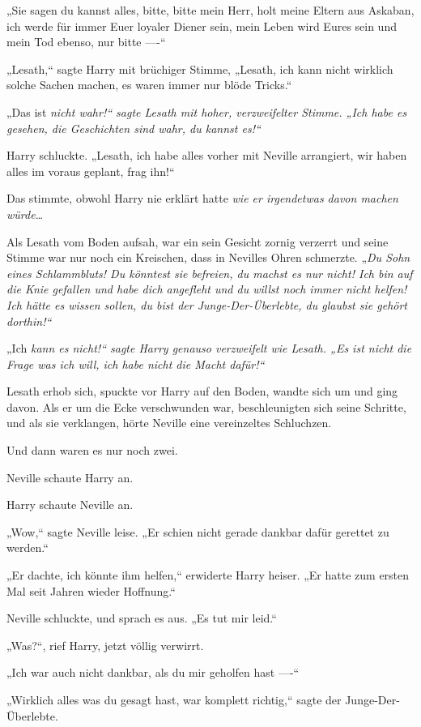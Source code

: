 {„Sie sagen du kannst alles, bitte, bitte mein Herr, holt meine Eltern aus Askaban, ich werde für immer Euer loyaler Diener sein, mein Leben wird Eures sein und mein Tod ebenso, nur bitte ----“

„Lesath,“ sagte Harry mit brüchiger Stimme, „Lesath, ich kann nicht wirklich solche Sachen machen, es waren immer nur blöde Tricks.“

„Das ist \emph{nicht wahr!“ sagte Lesath mit hoher, verzweifelter Stimme. „Ich \emph{habe es gesehen,} die Geschichten sind wahr, du \emph{kannst} es!“}

Harry schluckte. „Lesath, ich habe alles vorher mit Neville arrangiert, wir haben alles im voraus geplant, frag ihn!“

Das stimmte, obwohl Harry nie erklärt hatte \emph{wie er irgendetwas davon machen würde…}

Als Lesath vom Boden aufsah, war ein sein Gesicht zornig verzerrt und seine Stimme war nur noch ein Kreischen, dass in Nevilles Ohren schmerzte. „\emph{Du Sohn eines Schlammbluts! Du könntest sie befreien, du machst es nur nicht! Ich bin auf die Knie gefallen und habe dich angefleht und du willst noch immer nicht helfen! Ich hätte es wissen sollen, du bist der Junge-Der-Überlebte, du glaubst sie gehört \emph{dorthin!“}}

„Ich \emph{kann es nicht!“ sagte Harry genauso verzweifelt wie Lesath. „Es ist nicht die Frage was ich will, ich habe nicht die \emph{Macht} dafür!“}

Lesath erhob sich, spuckte vor Harry auf den Boden, wandte sich um und ging davon. Als er um die Ecke verschwunden war, beschleunigten sich seine Schritte, und als sie verklangen, hörte Neville eine vereinzeltes Schluchzen.

Und dann waren es nur noch zwei.

Neville schaute Harry an.

Harry schaute Neville an.

„Wow,“ sagte Neville leise. „Er schien nicht gerade dankbar dafür gerettet zu werden.“

„Er dachte, ich könnte ihm helfen,“ erwiderte Harry heiser. „Er hatte zum ersten Mal seit Jahren wieder Hoffnung.“

Neville schluckte, und sprach es aus. „Es tut mir leid.“

„Was?“, rief Harry, jetzt völlig verwirrt.

„Ich war auch nicht dankbar, als du mir geholfen hast ----“

„Wirklich alles was du gesagt hast, war komplett richtig,“ sagte der Junge-Der-Überlebte.

}

